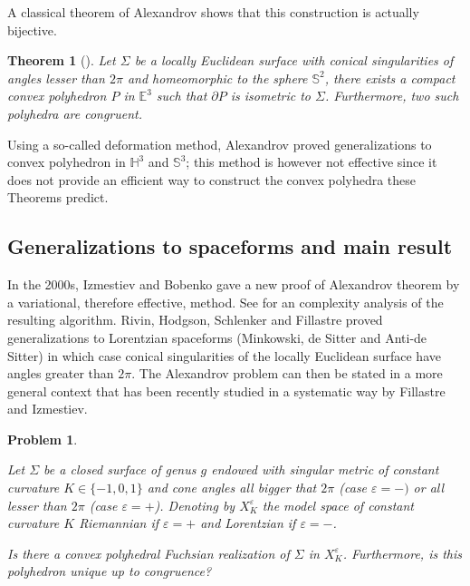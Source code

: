 \documentclass[a4paper,12pt]{article}
\def\H{\mathbb{H}}
\def\E{\mathbf E}
\def\E{\mathbb{E}}
\def\SS{\mathbb{S}}
\def\E{\mathbb{E}}
\newtheorem*{theon}{Theorem}
\newtheorem*{problem}{Problem}
\theoremstyle{definition}
\begin{document}
		A classical theorem of Alexandrov \cite{MR13540} shows that this construction is actually bijective.
		\begin{theon}[\cite{MR13540}]\label{theo:mr} Let $\Sigma$ be a locally Euclidean
			surface with conical singularities of angles lesser than $2\pi$ and homeomorphic to the sphere $\SS^2$,
			there exists a compact convex polyhedron $P$ in $\E^3$ such that $\partial P$ is isometric to $\Sigma$. Furthermore, two such polyhedra are congruent.
		\end{theon}
		Using a so-called deformation method, Alexandrov proved generalizations to convex polyhedron in $\H^3$ and $\SS^3$; this method is however not effective since it does not provide an efficient way to construct the convex polyhedra these Theorems predict.
\subsection{Generalizations to spaceforms and main result}
		
		In the 2000s,
		Izmestiev and Bobenko
		gave a new proof of Alexandrov theorem by a variational, therefore effective, method. See \cite{kane2009pseudopolynomial} for an complexity analysis of the resulting algorithm. Rivin, Hodgson, Schlenker and Fillastre
		proved generalizations to Lorentzian spaceforms (Minkowski, de Sitter and Anti-de Sitter) in which case conical singularities of the locally Euclidean surface have angles greater than $2\pi$.
		The Alexandrov problem can then be stated in a more general context that has been recently studied in a systematic way by Fillastre and Izmestiev. 
		
		\begin{problem}\label{rem:closed_surface_genus_endowed}
		
		
		
		 Let $\Sigma$ be a closed surface of genus $g$ endowed with singular metric of constant curvature
	 $K\in \{-1,0,1\}$ and cone angles all bigger that
	 $2\pi$ (case $\varepsilon=-)$ or all lesser than $2\pi$ (case $\varepsilon =+$).
		 Denoting by $X_K^\varepsilon$ the model space of constant curvature $K$ Riemannian if $\varepsilon=+$ and Lorentzian if $\varepsilon=-$.
        
         Is there a convex polyhedral Fuchsian realization of $\Sigma$  in $X_{K}^{\varepsilon}$.
		 Furthermore, is this polyhedron unique up to congruence?
		\end{problem}
\end{document}
